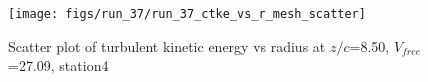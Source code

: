 \begin{figure}[H]
\centering
\texttt{[image: figs/run\_37/run\_37\_ctke\_vs\_r\_mesh\_scatter]}
\caption{Scatter plot of turbulent kinetic energy vs radius at $z/c$=8.50, $V_{free}$=27.09, station4}
\label{fig:run_37_ctke_vs_r_mesh_scatter}
\end{figure}


